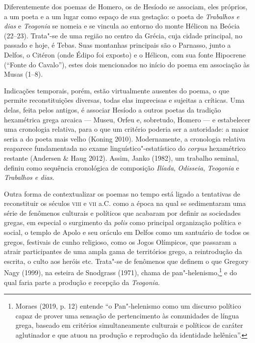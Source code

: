 
\noindent{}Diferentemente dos poemas de Homero, os de Hesíodo se associam, eles
próprios, a um poeta e a um lugar como espaço de sua gestação: o poeta
de \emph{Trabalhos e dias} e  \emph{Teogonia} se nomeia e se vincula ao entorno do monte Hélicon na
Beócia (22--23). Trata"-se de uma região no centro da Grécia, cuja cidade
principal, no passado e hoje, é Tebas. Suas montanhas principais são o
Parnasso, junto a Delfos, o Citéron (onde Édipo foi exposto) e o
Hélicon, com sua fonte Hipocrene (``Fonte do Cavalo''), estes dois
mencionados no início do poema em associação às Musas (1--8).

Indicações temporais, porém, estão virtualmente ausentes do poema, o que
permite reconstituições diversas, todas elas imprecisas e sujeitas a
críticas. Uma delas, feita pelos antigos, é associar Hesíodo a outros
poetas da tradição hexamétrica grega arcaica --- Museu, Orfeu e,
sobretudo, Homero --- e estabelecer uma cronologia relativa, para o que
um critério poderia ser a autoridade: a maior seria a do poeta mais
velho (Koning 2010). Modernamente, a cronologia relativa reaparece
fundamentada no exame linguístico"-estatístico do \emph{corpus}
hexamétrico restante (Andersen \& Haug 2012). Assim, Janko (1982), um
trabalho seminal, definiu como sequência cronológica de composição
\emph{Ilíada}, \emph{Odisseia}, \emph{Teogonia} e \emph{Trabalhos e
dias}.

Outra forma de contextualizar os poemas no tempo está ligado a
tentativas de reconstituir os séculos \textsc{viii} e \textsc{vii} a.C. como a época na
qual se sedimentaram uma série de fenômenos culturais e políticos que
acabaram por definir as sociedades gregas, em especial o surgimento da
\emph{polis} como principal organização política e social, o templo de
Apolo e seu oráculo em Delfos como um santuário de todos os gregos,
festivais de cunho religioso, como os Jogos Olímpicos, que passaram a
atrair participantes de uma ampla gama de territórios grego, a
reintrodução da escrita, o culto aos heróis etc. Trata"-se de fenômenos
que definem o que Gregory Nagy (1999), na esteira de Snodgrass (1971),
chama de pan"-helenismo,\footnote{Moraes (2019, p. 12) entende ``o
  Pan"-helenismo como um discurso político capaz de prover uma sensação
  de pertencimento às comunidades de língua grega, baseado em critérios
  simultaneamente culturais e políticos de caráter aglutinador e que
  atuou na produção e reprodução da identidade helênica''.} e do qual
faria parte a produção e recepção da \emph{Teogonia}.

